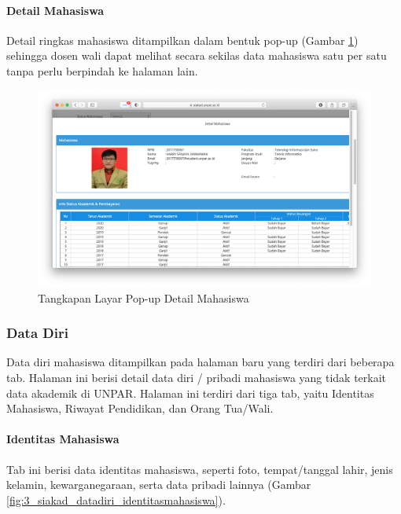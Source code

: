 \paragraph{Detail Mahasiswa} Detail ringkas mahasiswa ditampilkan dalam bentuk pop-up (Gambar \ref{fig:3_siakad_detailmahasiswa}) sehingga dosen wali dapat melihat secara sekilas data mahasiswa satu per satu tanpa perlu berpindah ke halaman lain.

\begin{figure}[H]
    \centering
    \includegraphics[scale=0.35]{Gambar/siakad_detailmahasiswa.png}
    \caption{Tangkapan Layar Pop-up Detail Mahasiswa}
    \label{fig:3_siakad_detailmahasiswa}
\end{figure}

\subsubsection{Data Diri}

Data diri mahasiswa ditampilkan pada halaman baru yang terdiri dari beberapa tab. Halaman ini berisi detail data diri / pribadi mahasiswa yang tidak terkait data akademik di UNPAR. Halaman ini terdiri dari tiga tab, yaitu Identitas Mahasiswa, Riwayat Pendidikan, dan Orang Tua/Wali.

\paragraph{Identitas Mahasiswa} Tab ini berisi data identitas mahasiswa, seperti foto, tempat/tanggal lahir, jenis kelamin, kewarganegaraan, serta data pribadi lainnya (Gambar \ref{fig:3_siakad_datadiri_identitasmahasiswa}).

